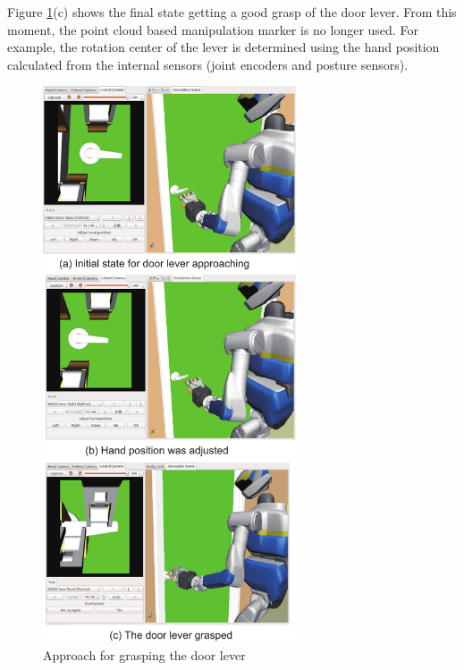 Figure \ref{fig:door_lever_grasp}(c) shows the final state getting a good grasp of the door lever.
From this moment, the point cloud based manipulation marker is no longer used.
For example, the rotation center of the lever is determined using the hand position calculated from
the internal sensors (joint encoders and posture sensors). 
%
\begin{figure}[t]
  \centering
  \includegraphics[width = 7.5cm]{img/approach_door_lever}
  \caption{Approach for grasping the door lever}
  \label{fig:door_lever_grasp}
\end{figure}


